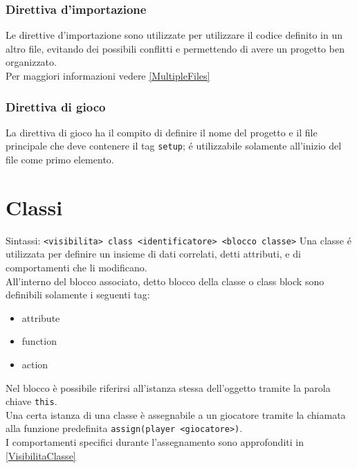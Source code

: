 \subsubsection{Direttiva d'importazione}
Le direttive d'importazione sono utilizzate per utilizzare il codice definito in un altro
file, evitando dei possibili conflitti e permettendo di avere un progetto ben organizzato. \\
Per maggiori informazioni vedere \ref{MultipleFiles}

\subsubsection{Direttiva di gioco}
La direttiva di gioco ha il compito di definire il nome del progetto e il file principale
che deve contenere il tag \lstinline|setup|; é utilizzabile solamente all'inizio del file 
come primo elemento. \\


\section{Classi}
Sintassi: \lstinline|<visibilita> class <identificatore> <blocco classe>|
Una classe é utilizzata per definire un insieme di dati correlati, detti attributi, e di 
comportamenti che li modificano. \\
All'interno del blocco associato, detto blocco della classe o class block sono definibili
solamente i seguenti tag:
\begin{itemize}
    \item attribute
    \item function
    \item action
\end{itemize}
Nel blocco è possibile riferirsi all'istanza stessa dell'oggetto tramite la parola chiave \lstinline|this|. \\
Una certa istanza di una classe è assegnabile a un giocatore tramite la chiamata alla funzione predefinita \lstinline|assign(player <giocatore>)|. \\
I comportamenti specifici durante l'assegnamento sono approfonditi in \ref*{VisibilitaClasse}


